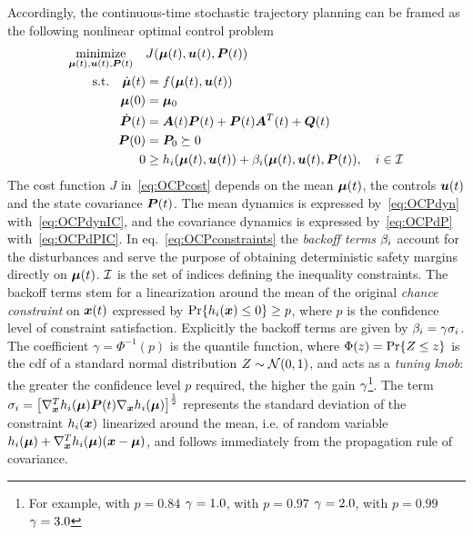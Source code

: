 Accordingly, the continuous-time stochastic trajectory planning can be framed as the following nonlinear optimal control problem
\begin{subequations}\label{eq:OCP}
\begin{align}
	\underset{\bmu(t), \bu(t), \bP(t)}{\text{minimize}} \quad & J(\bmu(t), \bu(t), \bP(t)) \label{eq:OCPcost} \\
	\text{s.t.} \quad \dbmu(t)           &= f(\bmu(t), \bu(t)) \label{eq:OCPdyn} \\
	\phantom{\text{s.t.} \quad} \bmu(0)  &= \bmu_0 \label{eq:OCPdynIC} \\
	\phantom{\text{s.t.} \quad} \dbP(t) &= \bA(t) \bP(t) + \bP(t) \bA^T(t) + \bQ(t) \label{eq:OCPdP} \\
	\phantom{\text{s.t.} \quad} \bP(0)  &= \bP_0 \succeq 0 \label{eq:OCPdPIC} \\ %
	\phantom{\text{s.t.} \qquad} 0&       \geq h_i(\bmu(t), \bu(t))
	+ \be_i(\bmu(t), \bu(t), \bP(t)),
	\quad i \in \calI \label{eq:OCPconstraints}
\end{align}
\end{subequations}
The cost function $J$ in~\eqref{eq:OCPcost} depends on the mean $\boldsymbol{\mu}(t)$, the controls $\boldsymbol{u}(t)$ and the state covariance $\boldsymbol{P}(t)$. The mean dynamics is expressed by~\eqref{eq:OCPdyn} with~\eqref{eq:OCPdynIC}, and the covariance dynamics is expressed by~\eqref{eq:OCPdP} with~\eqref{eq:OCPdPIC}. In eq.~\eqref{eq:OCPconstraints} the \emph{backoff terms} $\beta_i$ account for the disturbances and serve the purpose of obtaining deterministic safety margins directly on $\boldsymbol{\mu}(t)$. $\mathcal{I}$ is the set of indices defining the inequality constraints. The backoff terms stem for a linearization around the mean of the original \emph{chance constraint} on $\boldsymbol{x}(t)$ expressed by $\operatorname{Pr} \{h_i(\boldsymbol{x}) \leq 0\}\geq p$, where $p$ is the confidence level of constraint satisfaction. Explicitly the backoff terms are given by
$\beta_i = \gamma \sigma_i$. The coefficient $\gamma = \Phi^{-1}(p)$ is the quantile function, where $\Phi(z)=\operatorname{Pr} \{Z\leq z\}$ is the cdf of a standard normal distribution $Z \sim \mathcal{N}(0,1)$, and acts as a \emph{tuning knob}: the greater the confidence level $p$ required, the higher the gain $\gamma$\footnote{For example, with $p=0.84$ $\gamma = 1.0$, with $p=0.97$ $\gamma = 2.0$, with $p=0.99$ $\gamma = 3.0$}. The term $\sigma_i = \big[\nabla^T_{\boldsymbol{x}} h_i(\boldsymbol{\mu}) \boldsymbol{P}(t) \nabla_{\boldsymbol{x}} h_i(\boldsymbol{\mu})\big]^{\frac{1}{2}}$ represents the standard deviation of the constraint $h_i(\boldsymbol{x})$ linearized around the mean, i.e. of random variable $h_i(\boldsymbol{\mu})+\nabla^T_{\boldsymbol{x}} h_i(\boldsymbol{\mu}) (\boldsymbol{x} - \boldsymbol{\mu})$, and follows immediately from the propagation rule of covariance.


